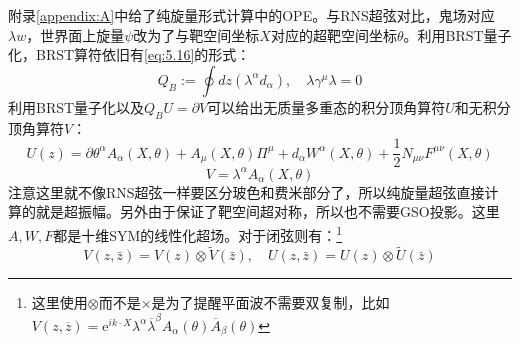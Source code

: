 附录\ref{appendix:A}中给了纯旋量形式计算中的OPE。与RNS超弦对比，鬼场对应$\lambda w$，世界面上旋量$\psi$改为了与靶空间坐标$X$对应的超靶空间坐标$\theta$。利用BRST量子化，BRST算符依旧有\ref{eq:5.16}的形式：
\begin{equation}
	Q_B:=\oint dz\left(\lambda^\alpha d_\alpha\right),\quad \lambda\gamma^\mu\lambda=0
\end{equation}
利用BRST量子化以及$Q_B U = \partial V$可以给出无质量多重态的积分顶角算符$U$和无积分顶角算符$V$：
\begin{equation}
	\label{eq:5.39}
	U(z)=\partial\theta^\alpha A_\alpha(X,\theta)+A_\mu(X,\theta)\Pi^\mu+d_\alpha W^\alpha(X,\theta)+\frac{1}{2}N_{\mu\nu}F^{\mu\nu}(X,\theta)
\end{equation}
\begin{equation}
	\label{eq:5.40}
	V=\lambda^\alpha A_\alpha(X,\theta)
\end{equation}
注意这里就不像RNS超弦一样要区分玻色和费米部分了，所以纯旋量超弦直接计算的就是超振幅。另外由于保证了靶空间超对称，所以也不需要GSO投影。这里$A,W,F$都是十维SYM的线性化超场。对于闭弦则有：\footnote{这里使用$\otimes$而不是$\times$是为了提醒平面波不需要双复制，比如$V(z,\overline{z})=\mathrm{e}^{ik\cdot X}\lambda^\alpha\overline{\lambda}^\beta A_\alpha(\theta)\overline{A}_\beta(\theta)$}
\begin{equation}
	V(z,\bar z) = V(z)\otimes \tilde V(\bar z),\quad U(z,\bar z) = U(z)\otimes \tilde U(\bar z)
\end{equation}


